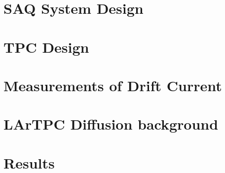 \section{SAQ System Design}

\section{TPC Design}

\section{Measurements of Drift Current}

\section{LArTPC Diffusion background}

\section{Results}